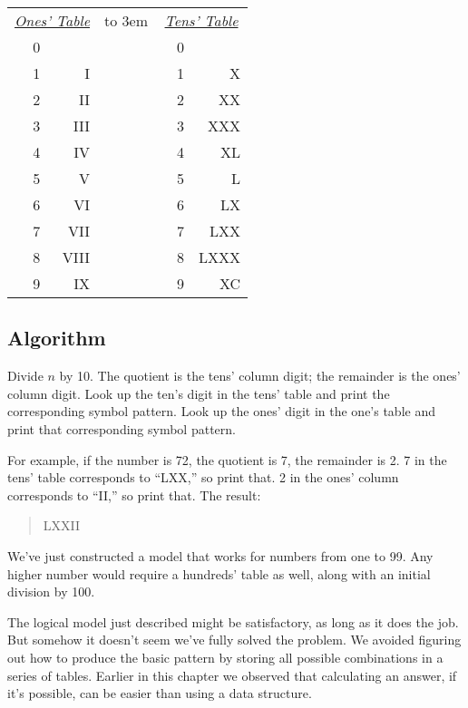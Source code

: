 \bigskip
\begin{tabular}{lcrclcr}
\multicolumn{3}{c}{\underline{\emph{Ones' Table}}} &
\hbox to 3em{\hss} & \multicolumn{3}{c}{\underline{\emph{Tens' Table}}} \\
& 0 &          & &    & 0 & \\
& 1 &       I  & &    & 1 &      X \\
& 2 &      II  & &    & 2 &     XX \\
& 3 &     III  & &    & 3 &    XXX \\
& 4 &      IV  & &    & 4 &     XL \\
& 5 &       V  & &    & 5 &      L \\
& 6 &      VI  & &    & 6 &     LX \\
& 7 &     VII  & &    & 7 &    LXX \\
& 8 &    VIII  & &    & 8 &   LXXX \\
& 9 &      IX  & &    & 9 &     XC \\
\end{tabular}
\bigskip

\subsection{Algorithm}

Divide $n$ by 10. The quotient is the tens' column digit; the remainder is
the ones' column digit. Look up the ten's digit in the tens' table and
print the corresponding symbol pattern. Look up the ones' digit in the
one's table and print that corresponding symbol pattern.

For example, if the number is 72, the quotient is 7, the remainder is 2. 7
in the tens' table corresponds to ``LXX,'' so print that. 2 in the ones'
column corresponds to ``II,'' so print that. The result:

\begin{quote}
{\sf LXXII}
\end{quote}
We've just constructed a model that works for numbers from one to 99.
Any higher number would require a hundreds' table as well, along with
an initial division by 100.

The logical model just described might be satisfactory, as long as it
does the job. But somehow it doesn't seem we've fully solved the problem.
We avoided figuring out how to produce the basic pattern by storing
all possible combinations in a series of tables. Earlier in this chapter we
observed that calculating an answer, if it's possible, can be easier than
using a data structure.

